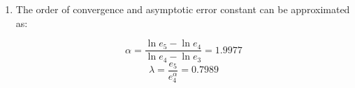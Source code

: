 \documentclass[12pt]{article}
\begin{document}
\begin{description}
\begin{enumerate} [label=(\alph*)]
	        Fixed point iteration converges for the interval $[a,b]$ if $|g'(x)| < 1$ for $x \in [a,b]$.
	        	
	        \begin{equation*}
	        	|g'(x)| = \left| \frac{f(x)f''(x)}{(f'(x))^2} \right|
	        \end{equation*}
	        	
	        $f(x) = -2x^3 + x - e^{-x} - 1$ \\
	        $f'(x) = -6x^2 + 1 + e^{-x}$ \\
	        $f''(x) = -12x - e^{-x}$ \\
	        	
	        Plugging this equation into Python and plotting, we can see that $\exists x \in [-3,3], \; |g'(x)| > 1 \implies$ FPI and the Newton Method are not guaranteed to converge on the interval [-3,3].
	        	
	        \begin{figure}[ht]	\centering\texttt{[image: HW2Figs/AERO222\_HW2\_P5.png]}
	        	\caption{$\left|g'(x)\right|$ for $x \in \left[-3,3\right]$}
	        \end{figure}
	
	        \item The order of convergence and asymptotic error constant can be approximated as:
   	
   	        \begin{equation*}
   	             \alpha= \frac{\ln e_{5}-\ln e_4}{\ln e_4 - \ln e_{3}} = 1.9977
   	        \end{equation*}
   	         \begin{equation*}
   	                     \lambda= \dfrac{e_5}{e_{4}^\alpha} = 0.7989
   	        \end{equation*}
		
\end{enumerate}
\color{black}
\fi


\end{description}
\end{document}
